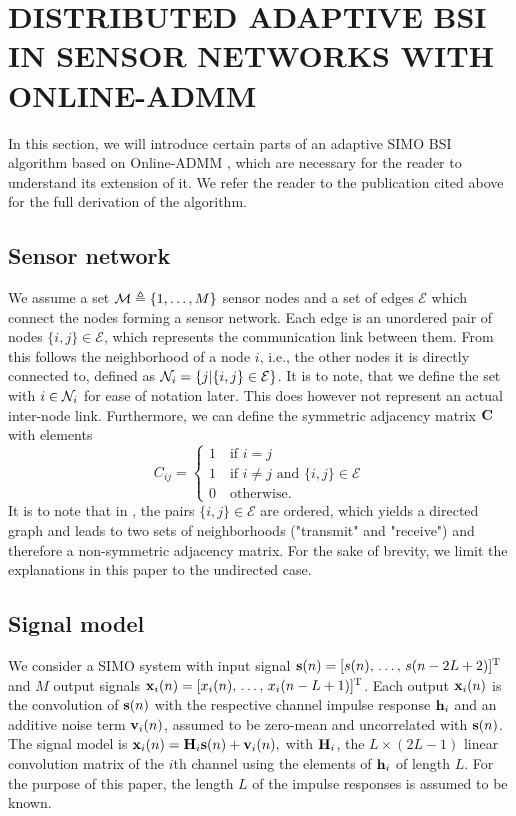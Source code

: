 \documentclass{article}
\begin{document}
\section{DISTRIBUTED ADAPTIVE BSI IN SENSOR NETWORKS WITH ONLINE-ADMM}
\label{sec:dbsi}
In this section, we will introduce certain parts of an adaptive SIMO BSI algorithm based on Online-ADMM \cite{blochbergerDBSI}, which are necessary for the reader to understand its extension of it.
We refer the reader to the publication cited above for the full derivation of the algorithm.

\subsection[]{Sensor network}
We assume a set \(\mathcal{M} \triangleq \{1,\ldots,M\}\) sensor nodes and a set of edges \(\mathcal{E}\) which connect the nodes forming a sensor network.
Each edge is an unordered pair of nodes \(\{i,j\} \in \mathcal{E}\), which represents the communication link between them.
From this follows the neighborhood of a node \(i\), i.e., the other nodes it is directly connected to, defined as \(\mathcal{N}_i = \{j|\{i,j\} \in \mathcal{E}\}\).
It is to note, that we define the set with \(i \in \mathcal{N}_i\) for ease of notation later.
This does however not represent an actual inter-node link.
Furthermore, we can define the symmetric adjacency matrix \(\bm{\mathrm{C}}\) with elements
\begin{equation}
    C_{ij} = \begin{cases}
        1 \quad \text{if } i = j\\
        1 \quad \text{if } i \neq j \text{ and }\{i,j\} \in \mathcal{E}\\
        0 \quad \text{otherwise}.
    \end{cases}
\end{equation}
It is to note that in \cite{blochbergerDBSI}, the pairs \(\{i,j\} \in \mathcal{E}\) are ordered, which yields a directed graph and leads to two sets of neighborhoods ("transmit" and "receive") and therefore a non-symmetric adjacency matrix.
For the sake of brevity, we limit the explanations in this paper to the undirected case.

\subsection[]{Signal model}
We consider a SIMO system with input signal \(\bm{\mathrm{s}}(n) = [s(n),\,\ldots,\,s(n-2L+2)]^{{\mathrm{T}}}\) and \(M\) output signals \(\bm{\mathrm{x}}_i(n)= [x_i(n),\,\ldots,\,x_i(n-L+1)]^{{\mathrm{T}}}\).
Each output \(\bm{\mathrm{x}}_i(n)\) is the convolution of \(\bm{\mathrm{s}}(n)\) with the respective channel impulse response \(\bm{\mathrm{h}}_i\) and an additive noise term \(\bm{\mathrm{v}}_i(n)\), assumed to be zero-mean and uncorrelated with \(\bm{\mathrm{s}}(n)\).
The signal model is \(\bm{\mathrm{x}}_i(n) = \bm{\mathrm{H}}_i \bm{\mathrm{s}}(n) + \bm{\mathrm{v}}_i(n),\)
with \(\bm{\mathrm{H}}_i\), the \(L \times (2L-1)\) linear convolution matrix of the \(i\)th channel using the elements of \(\bm{\mathrm{h}}_i\) of length \(L\).
For the purpose of this paper, the length \(L\) of the impulse responses is assumed to be known.
\end{document}
